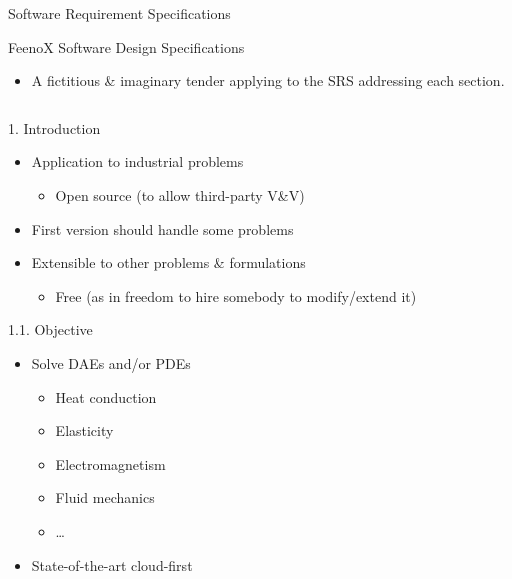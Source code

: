 \documentclass[
  ignorenonframetext,
  aspectratio=169,
]{beamer}
\providecommand{\tightlist}{%
  \setlength{\itemsep}{0pt}\setlength{\parskip}{0pt}}
\begin{document}
\begin{frame}{Software Requirement Specifications}
\begin{exampleblock}{FeenoX Software Design Specifications}
\protect\hypertarget{feenox-software-design-specifications}{}
\begin{itemize}
\tightlist
\item
  A fictitious \& imaginary tender applying to the SRS addressing each
  section.
\end{itemize}
\end{exampleblock}
\end{frame}

\begin{frame}[fragile]{}
\protect\hypertarget{section-1}{}
\begin{columns}[T]
\begin{column}{0.5\textwidth}
\begin{block}{1. Introduction}
\protect\hypertarget{introduction}{}
\begin{itemize}
\tightlist
\item
  Application to industrial problems

  \begin{itemize}
  \tightlist
  \item
    Open source (to allow third-party V\&V)
  \end{itemize}
\item
  First version should handle some problems
\item
  Extensible to other problems \& formulations

  \begin{itemize}
  \tightlist
  \item
    Free (as in freedom to hire somebody to modify/extend it)
  \end{itemize}
\end{itemize}

\begin{block}{1.1. Objective}
\protect\hypertarget{objective}{}
\begin{itemize}
\tightlist
\item
  Solve DAEs and/or PDEs

  \begin{itemize}
  \tightlist
  \item
    Heat conduction
  \item
    Elasticity
  \item
    Electromagnetism
  \item
    Fluid mechanics
  \item
    \ldots{}
  \end{itemize}
\item
  State-of-the-art cloud-first
\end{itemize}
\end{block}
\end{block}
\end{column}


\end{columns}
\end{frame}
\end{document}
